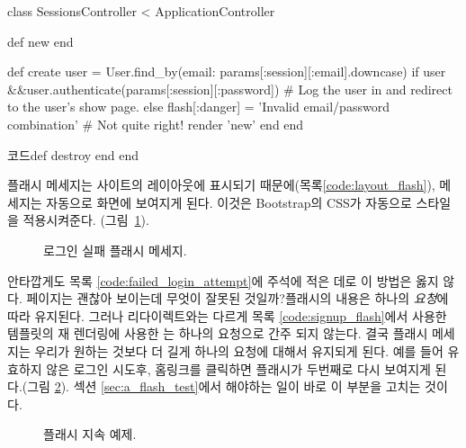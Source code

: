 \begin{codelisting} \label{code:failed_login_attempt}  

\begin{code} class SessionsController < ApplicationController 

def new end 

def create user = User.find_by(email: params[:session][:email].downcase) if user &&user.authenticate(params[:session][:password]) # Log the user in and redirect to the user's show page. else flash[:danger] = 'Invalid email/password combination' # Not quite right! render 'new' end end 

코드def destroy end end \end{code} \end{codelisting} 

\noindent 플래시 메세지는 사이트의 레이아웃에 표시되기 때문에(목록\ref{code:layout_flash}),  메세지는 자동으로 화면에 보여지게 된다. 이것은 Bootstrap의 CSS가 자동으로 스타일을 적용시켜준다. (그림~\ref{fig:failed_login_flash}). 

\begin{figure} \begin{center}  \end{center} \caption{로그인 실패 플래시 메세지.\label{fig:failed_login_flash}} \end{figure} 

안타깝게도 목록 \ref{code:failed_login_attempt}에 주석에 적은 데로 이 방법은 옳지 않다. 페이지는 괜찮아 보이는데 무엇이 잘못된 것일까?플래시의 내용은 하나의 \emph{요청}에 따라 유지된다. 그러나 리다이렉트와는 다르게 목록 \ref{code:signup_flash}에서 사용한 템플릿의 재 렌더링에 사용한 는 하나의 요청으로 간주 되지 않는다. 결국 플래시 메세지는 우리가 원하는 것보다 더 길게 하나의 요청에 대해서 유지되게 된다. 예를 들어 유효하지 않은 로그인 시도후, 홈링크를 클릭하면 플래시가 두번째로 다시 보여지게 된다.(그림 \ref{fig:flash_persistence}). 섹션 \ref{sec:a_flash_test}에서 해야하는 일이 바로 이 부분을 고치는 것이다. 

\begin{figure} \begin{center}  \end{center} \caption{플래시 지속 예제.\label{fig:flash_persistence}} \end{figure} 

